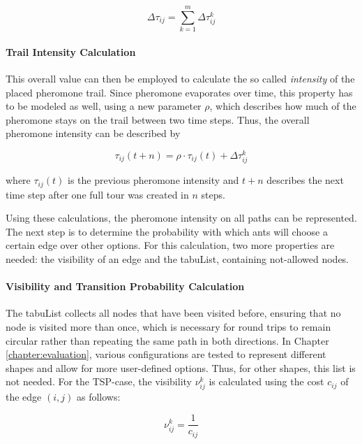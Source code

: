 \begin{equation}\label{eq:deltaTau}
	\Delta\tau_{ij} = \sum_{k=1}^{m} \Delta\tau_{ij}^k 
\end{equation}

\paragraph{Trail Intensity Calculation}

This overall value can then be employed to calculate the so called \textit{intensity} of the placed pheromone trail.
Since pheromone evaporates over time, this property has to be modeled as well, using a new parameter $\rho$, which describes how much of the pheromone stays on the trail between two time steps.
Thus, the overall pheromone intensity can be described by

\begin{equation}\label{eq:trailIntensity}
	\tau_{ij}(t+n) = \rho \cdot \tau_{ij}(t)+\Delta\tau_{ij}^k 
\end{equation}

where $\tau_{ij}(t)$ is the previous pheromone intensity and $t+n$ describes the next time step after one full tour was created in $n$ steps.

Using these calculations, the pheromone intensity on all paths can be represented. 
The next step is to determine the probability with which ants will choose a certain edge over other options.
For this calculation, two more properties are needed: the visibility of an edge and the tabuList, containing not-allowed nodes.

\paragraph{Visibility and Transition Probability Calculation}

The tabuList collects all nodes that have been visited before, ensuring that no node is visited more than once, which is necessary for round trips to remain circular rather than repeating the same path in both directions.
In Chapter \ref{chapter:evaluation}, various configurations are tested to represent different shapes and allow for more  user-defined options. 
Thus, for other shapes, this list is not needed.
For the TSP-case, the visibility $\nu_{ij}^k$ is calculated using the cost $c_{ij}$ of the edge $(i,j)$ as follows:

\begin{equation}\label{eq:visibility}
	\nu_{ij}^k = \frac{1}{c_{ij}}
\end{equation}

